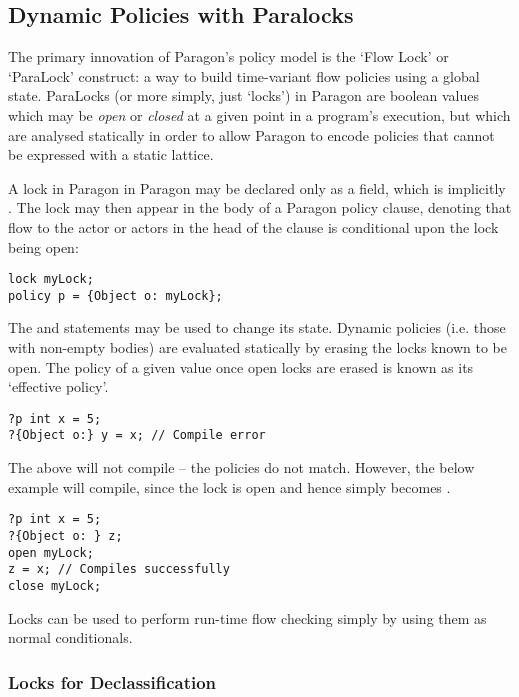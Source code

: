 \subsection{Dynamic Policies with Paralocks}

The primary innovation of Paragon's policy model is the `Flow Lock' or `ParaLock' construct: a way to build time-variant flow policies using a global state. ParaLocks (or more simply, just `locks') in Paragon are boolean values which may be \textit{open} or \textit{closed} at a given point in a program's execution, but which are analysed statically in order to allow Paragon to encode policies that cannot be expressed with a static lattice.

A lock in Paragon in Paragon may be declared only as a field, which is implicitly . The lock may then appear in the body of a Paragon policy clause, denoting that flow to the actor or actors in the head of the clause is conditional upon the lock being open:

\begin{verbatim}
lock myLock;
policy p = {Object o: myLock};
\end{verbatim}

The  and  statements may be used to change its state. Dynamic policies (i.e. those with non-empty bodies) are evaluated statically by erasing the locks known to be open. The policy of a given value once open locks are erased is known as its `effective policy'.

\begin{verbatim}
?p int x = 5;
?{Object o:} y = x; // Compile error
\end{verbatim}

The above will not compile -- the policies do not match. However, the below example will compile, since the lock is open and hence  simply becomes .

\begin{verbatim}
?p int x = 5;
?{Object o: } z;
open myLock;
z = x; // Compiles successfully
close myLock;
\end{verbatim}

Locks can be used to perform run-time flow checking simply by using them as normal conditionals.

\subsubsection{Locks for Declassification}

